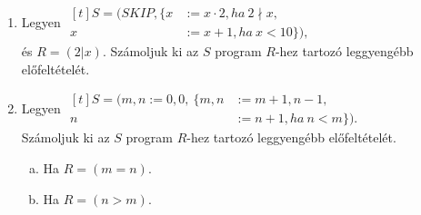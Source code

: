 \documentclass[12pt]{article}
\begin{document}
\begin{enumerate}
	\item Legyen $\begin{aligned}[t]
			S = (SKIP, \{x &:= x \cdot 2, ha\ 2 \nmid x,\\
				x &:= x + 1, ha\ x < 10\}),
		\end{aligned}$\\
		és $R = (2 | x)$. Számoljuk ki az $S$ program $R$-hez tartozó leggyengébb előfeltételét.
	\item Legyen $\begin{aligned}[t]
			S = (m,n := 0,0,\ \{m,n &:= m+1, n-1,\\
				n &:= n + 1, ha\ n < m\}).
		\end{aligned}$\\
		Számoljuk ki az $S$ program $R$-hez tartozó leggyengébb előfeltételét.
		\begin{enumerate}[a)]
			\item Ha $R = (m = n).$
			\item Ha $R = (n > m).$
		\end{enumerate}
\end{enumerate}


\newpage
\end{document}
